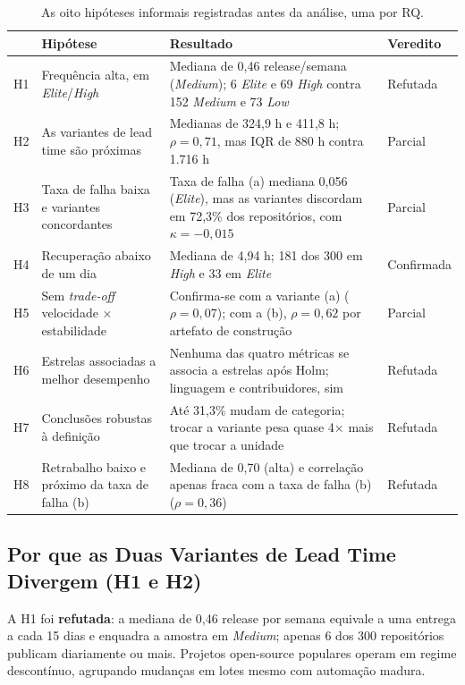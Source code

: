 \begin{table}[ht]
\centering
\caption{As oito hipóteses informais registradas antes da análise, uma por RQ.}
\label{tab:hipoteses}
\footnotesize
\begin{tabular}{p{0.7cm}p{4.4cm}p{5.4cm}l}
\toprule
 & \textbf{Hipótese} & \textbf{Resultado} & \textbf{Veredito} \\
\midrule
H1 & Frequência alta, em \emph{Elite}/\emph{High} &
     Mediana de 0,46 release/semana (\emph{Medium}); 6 \emph{Elite} e 69
     \emph{High} contra 152 \emph{Medium} e 73 \emph{Low} & Refutada \\
H2 & As variantes de lead time são próximas &
     Medianas de 324,9 h e 411,8 h; $\rho = 0{,}71$, mas IQR de 880 h contra 1.716 h &
     Parcial \\
H3 & Taxa de falha baixa e variantes concordantes &
     Taxa de falha (a) mediana 0,056 (\emph{Elite}), mas as variantes discordam em 72,3\% dos
     repositórios, com $\kappa = -0{,}015$ & Parcial \\
H4 & Recuperação abaixo de um dia &
     Mediana de 4,94 h; 181 dos 300 em \emph{High} e 33 em \emph{Elite} &
     Confirmada \\
H5 & Sem \emph{trade-off} velocidade × estabilidade &
     Confirma-se com a variante (a) ($\rho = 0{,}07$); com a (b), $\rho = 0{,}62$ por
     artefato de construção & Parcial \\
H6 & Estrelas associadas a melhor desempenho &
     Nenhuma das quatro métricas se associa a estrelas após Holm; linguagem e
     contribuidores, sim & Refutada \\
H7 & Conclusões robustas à definição &
     Até 31,3\% mudam de categoria; trocar a variante pesa quase 4× mais que trocar a
     unidade & Refutada \\
H8 & Retrabalho baixo e próximo da taxa de falha (b) &
     Mediana de 0,70 (alta) e correlação apenas fraca com a taxa de falha (b)
     ($\rho = 0{,}36$) & Refutada \\
\bottomrule
\end{tabular}
\end{table}

\subsection{Por que as Duas Variantes de Lead Time Divergem (H1 e H2)}

A H1 foi \textbf{refutada}: a mediana de 0,46 release por semana equivale a uma entrega a
cada 15 dias e enquadra a amostra em \emph{Medium}; apenas 6 dos 300 repositórios publicam
diariamente ou mais. Projetos open-source populares operam em regime descontínuo, agrupando
mudanças em lotes mesmo com automação madura.

